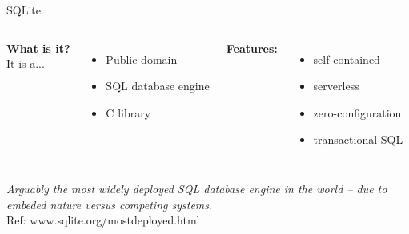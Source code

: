 \documentclass{beamer}
\begin{document}
\begin{frame}{SQLite}

\begin{columns}

{\bf What is it?} \\
It is a... 
\begin{itemize} \setlength\itemindent{-5pt}\itemsep-1pt
\item Public domain
\item SQL database engine
\item C library
\end{itemize}


{\bf Features:}
\begin{itemize} \setlength\itemindent{-5pt}\itemsep-1pt
\item self-contained
\item serverless
\item zero-configuration
\item transactional SQL
\end{itemize}

\end{columns}

\vspace{18pt} \textit{Arguably the most widely deployed SQL database engine in the world -- due to embeded nature versus competing systems.} \\
{\tiny Ref: www.sqlite.org/mostdeployed.html} 

\vspace{6pt} 

\end{frame}
\end{document}
